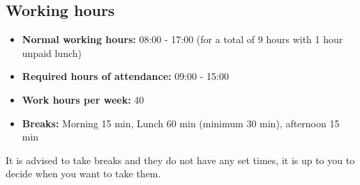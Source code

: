 \subsection*{Working hours}
    \begin{itemize}
        \item[] \textbf{Normal working hours:} 08:00 - 17:00 (for a total of 9 hours with 1 hour unpaid lunch)
        \item[] \textbf{Required hours of attendance:} 09:00 - 15:00
        \item[] \textbf{Work hours per week:} 40
        \item[] \textbf{Breaks:} Morning 15 min, Lunch 60 min (minimum 30 min), afternoon 15 min
    \end{itemize}
    
    It is advised to take breaks and they do not have any set times, it is up to you to decide when you want to take them. 
